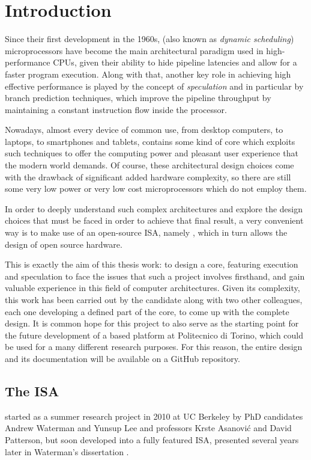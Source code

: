 \chapter{Introduction}
Since their first development in the 1960s, \emph{\ooo} (also known as \emph{dynamic scheduling}) microprocessors have become the main architectural paradigm used in high-performance \acsp{CPU}, given their ability to hide pipeline latencies and allow for a faster program execution. Along with that, another key role in achieving high effective performance is played by the concept of \emph{speculation} and in particular by branch prediction techniques, which improve the pipeline throughput by maintaining a constant instruction flow inside the processor.

Nowadays, almost every device of common use, from desktop computers, to laptops, to smartphones and tablets, contains some kind of \ooo core which exploits such techniques to offer the computing power and pleasant user experience that the modern world demands. Of course, these architectural design choices come with the drawback of significant added hardware complexity, so there are still some very low power or very low cost microprocessors which do not employ them.

In order to deeply understand such complex architectures and explore the design choices that must be faced in order to achieve that final result, a very convenient way is to make use of an open-source \acf{ISA}, namely \riscv, which in turn allows the design of open source hardware. 

This is exactly the aim of this thesis work: to design a \riscv core, featuring \ooo execution and speculation to face the issues that such a project involves firsthand, and gain valuable experience in this field of computer architectures. Given its complexity, this work has been carried out by the candidate along with two other colleagues, each one developing a defined part of the core, to come up with the complete design. It is common hope for this project to also serve as the starting point for the future development of a \riscv based platform at Politecnico di Torino, which could be used for a many different research purposes. For this reason, the entire design and its documentation will be available on a GitHub repository.

\section{The \riscv ISA}
\riscv started as a summer research project in 2010 at UC Berkeley by PhD candidates Andrew Waterman and Yunsup Lee and professors Krste Asanović and David Patterson, but soon developed into a fully featured \ac{ISA}, presented several years later in Waterman's dissertation \cite{waterman}. 

